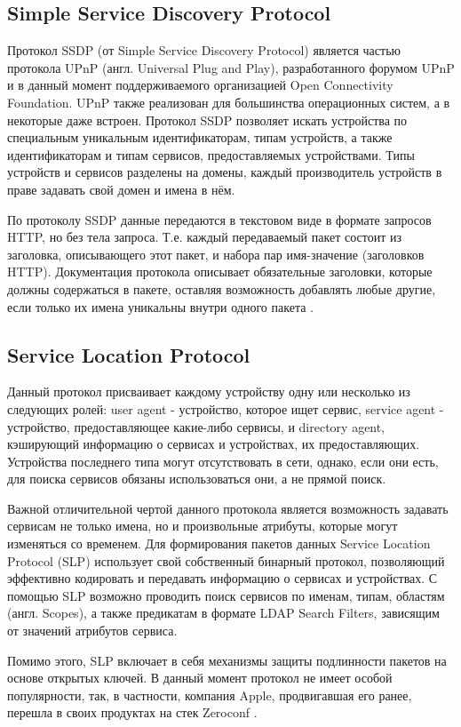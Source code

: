 \subsection{Simple Service Discovery Protocol}
Протокол SSDP (от Simple Service Discovery Protocol) является частью протокола UPnP (англ. Universal Plug and Play), разработанного форумом UPnP и в данный момент поддерживаемого организацией Open Connectivity Foundation.
UPnP также реализован для большинства операционных систем, а в некоторые даже встроен.
Протокол SSDP позволяет искать устройства по специальным уникальным идентификаторам, типам устройств, а также идентификаторам и типам сервисов, предоставляемых устройствами.
Типы устройств и сервисов разделены на домены, каждый производитель устройств в праве задавать свой домен и имена в нём.

По протоколу SSDP данные передаются в текстовом виде в формате запросов HTTP, но без тела запроса.
Т.е. каждый передаваемый пакет состоит из заголовка, описывающего этот пакет, и набора пар имя-значение (заголовков HTTP).
Документация протокола описывает обязательные заголовки, которые должны содержаться в пакете, оставляя возможность добавлять любые другие, если только их имена уникальны внутри одного пакета \cite{web:upnp}.

\subsection{Service Location Protocol}
Данный протокол присваивает каждому устройству одну или несколько из следующих ролей: user agent - устройство, которое ищет сервис, service agent - устройство, предоставляющее какие-либо сервисы, и directory agent, кэширующий информацию о сервисах и устройствах, их предоставляющих.
Устройства последнего типа могут отсутствовать в сети, однако, если они есть, для поиска сервисов обязаны использоваться они, а не прямой поиск.

Важной отличительной чертой данного протокола является возможность задавать сервисам не только имена, но и произвольные атрибуты, которые могут изменяться со временем.
Для формирования пакетов данных Service Location Protocol (SLP) использует свой собственный бинарный протокол, позволяющий эффективно кодировать и передавать информацию о сервисах и устройствах.
С помощью SLP возможно проводить поиск сервисов по именам, типам, областям (англ. Scopes), а также предикатам в формате LDAP Search Filters, зависящим от значений атрибутов сервиса.

Помимо этого, SLP включает в себя механизмы защиты подлинности пакетов на основе открытых ключей. 
В данный момент протокол не имеет особой популярности, так, в частности, компания Apple, продвигавшая его ранее, перешла в своих продуктах на стек Zeroconf \cite{web:slp}.

